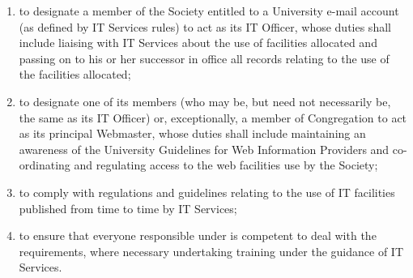 \documentclass[11pt]{article}
\begin{document}
\begin{enumerate}
\begin{enumerate}
\item \label{it:des} to designate a member of the Society entitled to a University e-mail account (as defined by IT Services rules) to act as its IT Officer, whose duties shall include liaising with IT Services about the use of facilities allocated and passing on to his or her successor in office all records relating to the use of the facilities allocated;
\item to designate one of its members (who may be, but need not necessarily be, the same as its IT Officer) or, exceptionally, a member of Congregation to act as its principal Webmaster, whose duties shall include maintaining an awareness of the University Guidelines for Web Information Providers and co-ordinating and regulating access to the web facilities use by the Society;
\item to comply with regulations and guidelines relating to the use of IT facilities published from time to time by IT Services;
\item \label{it:res}to ensure that everyone responsible under  is competent to deal with the requirements, where necessary undertaking training under the guidance of IT Services.
\end{enumerate}
\end{enumerate}
\end{document}
